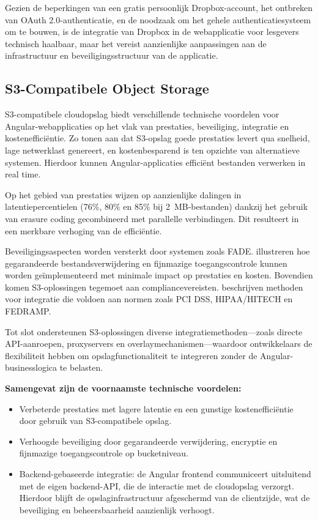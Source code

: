 Gezien de beperkingen van een gratis persoonlijk Dropbox-account, het ontbreken van OAuth 2.0-authenticatie, en de noodzaak om het gehele authenticatiesysteem 
om te bouwen, is de integratie van Dropbox in de webapplicatie voor lesgevers technisch haalbaar, maar het vereist aanzienlijke aanpassingen aan de infrastructuur 
en beveiligingsstructuur van de applicatie.

\subsection{S3-Compatibele Object Storage}

S3-compatibele cloudopslag biedt verschillende technische voordelen voor Angular-webapplicaties op het vlak van prestaties, beveiliging, integratie en kostenefficiëntie. Zo tonen \autocite{Jamal2021Performance} aan dat S3-opslag goede prestaties levert qua snelheid, lage netwerklast genereert, en kostenbesparend is ten opzichte van alternatieve systemen. Hierdoor kunnen Angular-applicaties efficiënt bestanden verwerken in real time.

Op het gebied van prestaties wijzen \autocite{Liang2014FAST} op aanzienlijke dalingen in latentiepercentielen (76\%, 80\% en 85\% bij 2~MB-bestanden) dankzij het gebruik van erasure coding gecombineerd met parallelle verbindingen. Dit resulteert in een merkbare verhoging van de efficiëntie.

Beveiligingsaspecten worden versterkt door systemen zoals FADE. \autocite{Tang2010FADE, Tang2012Secure} illustreren hoe gegarandeerde bestandsverwijdering en fijnmazige toegangscontrole kunnen worden geïmplementeerd met minimale impact op prestaties en kosten. Bovendien komen S3-oplossingen tegemoet aan compliancevereisten. \autocite{kolpakov2018data} beschrijven methoden voor integratie die voldoen aan normen zoals PCI DSS, HIPAA/HITECH en FEDRAMP.

Tot slot ondersteunen S3-oplossingen diverse integratiemethoden—zoals directe API-aanroepen, proxyservers en overlaymechanismen—waardoor ontwikkelaars de flexibiliteit hebben om opslagfunctionaliteit te integreren zonder de Angular-businesslogica te belasten.

\textbf{Samengevat zijn de voornaamste technische voordelen:}
\begin{itemize}
    \item Verbeterde prestaties met lagere latentie en een gunstige kostenefficiëntie door gebruik van S3-compatibele opslag.
    \item Verhoogde beveiliging door gegarandeerde verwijdering, encryptie en fijnmazige toegangscontrole op bucketniveau.
    \item Backend-gebaseerde integratie: de Angular frontend communiceert uitsluitend met de eigen backend-API, die de interactie met de cloudopslag verzorgt. Hierdoor blijft de opslaginfrastructuur afgeschermd van de clientzijde, wat de beveiliging en beheersbaarheid aanzienlijk verhoogt.
\end{itemize}

